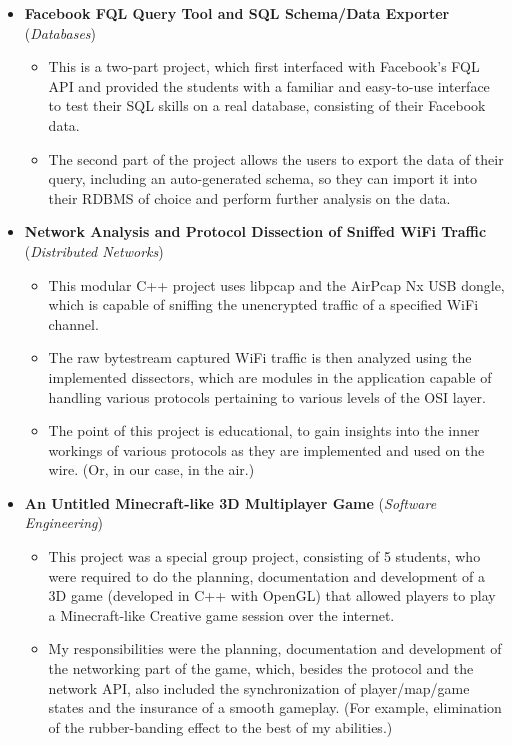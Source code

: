 \documentclass[11pt,a4paper]{article}
\begin{document}
\begin{itemize}
\begin{itemize}
		\end{itemize}
	\item	\label{db}  \textbf{Facebook FQL Query Tool and SQL Schema/Data Exporter} (\textit{Databases})
		\begin{itemize}
		\item	This is a two-part project, which first interfaced with Facebook's FQL API and provided the students with a familiar and easy-to-use interface to test their SQL skills on a real database, consisting of their Facebook data.
		\item	The second part of the project allows the users to export the data of their query, including an auto-generated schema, so they can import it into their RDBMS of choice and perform further analysis on the data.
		\end{itemize}
	\item	\label{net}  \textbf{Network Analysis and Protocol Dissection of Sniffed WiFi Traffic} (\textit{Distributed Networks})
		\begin{itemize}
		\item	This modular C++ project uses libpcap and the AirPcap Nx USB dongle, which is capable of sniffing the unencrypted traffic of a specified WiFi channel.
		\item	The raw bytestream captured WiFi traffic is then analyzed using the implemented dissectors, which are modules in the application capable of handling various protocols pertaining to various levels of the OSI layer.
		\item	The point of this project is educational, to gain insights into the inner workings of various protocols as they are implemented and used on the wire. (Or, in our case, in the air.)
		\end{itemize}
	\item	\label{seng}  \textbf{An Untitled Minecraft-like 3D Multiplayer Game} (\textit{Software Engineering})
		\begin{itemize}
		\item	This project was a special group project, consisting of 5 students, who were required to do the planning, documentation and development of a 3D game (developed in C++ with OpenGL) that allowed players to play a Minecraft-like Creative game session over the internet.
		\item	My responsibilities were the planning, documentation and development of the networking part of the game, which, besides the protocol and the network API, also included the synchronization of player/map/game states and the insurance of a smooth gameplay. (For example, elimination of the rubber-banding effect to the best of my abilities.)

\end{itemize}
\end{itemize}
\end{document}
